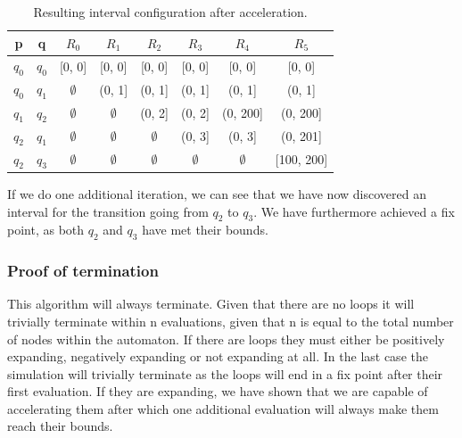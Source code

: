 \documentclass[12pt]{article}
\begin{document}
\begin{table}[t!]
	\begin{tabular}{ |c|c|c|c|c|c|c|c| }
		\hline
		p		& q 	& $R_0$ 		& $R_1$			& $R_2$			& $R_3$			& $R_4$ 		& $R_5$ \\
		\hline
		$q_0$	& $q_0$ & [0, 0] 		& [0, 0] 		& [0, 0] 		& [0, 0]		& [0, 0]		& [0, 0] \\
		$q_0$	& $q_1$ & $\emptyset$ 	& (0, 1]		& (0, 1] 		& (0, 1]		& (0, 1] 		& (0, 1] \\
		$q_1$	& $q_2$ & $\emptyset$ 	& $\emptyset$ 	& (0, 2] 		& (0, 2]		& (0, 200] 		& (0, 200] \\
		$q_2$	& $q_1$ & $\emptyset$ 	& $\emptyset$ 	& $\emptyset$	& (0, 3]		& (0, 3] 		& (0, 201] \\
		$q_2$	& $q_3$ & $\emptyset$ 	& $\emptyset$ 	& $\emptyset$	& $\emptyset$	& $\emptyset$	& [100, 200] \\
		\hline
	\end{tabular}
	\centering
	\caption{Resulting interval configuration after acceleration.}
	\label{table:table_example_acc}
\end{table}

If we do one additional iteration, we can see that we have now discovered an interval for the transition going from $q_2$ to $q_3$. We have furthermore achieved a fix point, as both $q_2$ and $q_3$ have met their bounds.

\subsubsection{Proof of termination}
This algorithm will always terminate. Given that there are no loops it will trivially terminate within n evaluations, given that n is equal to the total number of nodes within the automaton. If there are loops they must either be positively expanding, negatively expanding or not expanding at all. In the last case the simulation will trivially terminate as the loops will end in a fix point after their first evaluation. If they are expanding, we have shown that we are capable of accelerating them after which one additional evaluation will always make them reach their bounds. 
\end{document}
